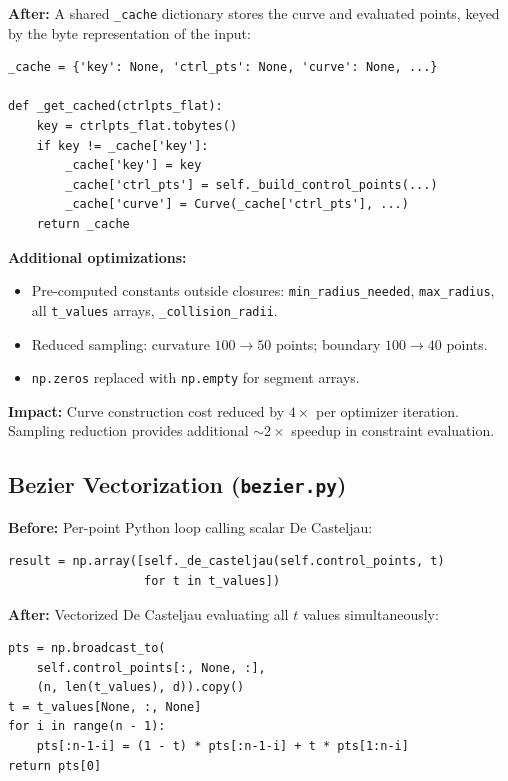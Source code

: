 \documentclass[11pt,a4paper]{article}
\begin{document}
\textbf{After:} A shared \texttt{\_cache} dictionary stores the curve and evaluated points, keyed by the byte representation of the input:
\begin{lstlisting}
_cache = {'key': None, 'ctrl_pts': None, 'curve': None, ...}

def _get_cached(ctrlpts_flat):
    key = ctrlpts_flat.tobytes()
    if key != _cache['key']:
        _cache['key'] = key
        _cache['ctrl_pts'] = self._build_control_points(...)
        _cache['curve'] = Curve(_cache['ctrl_pts'], ...)
    return _cache
\end{lstlisting}

\textbf{Additional optimizations:}
\begin{itemize}[nosep]
    \item Pre-computed constants outside closures: \texttt{min\_radius\_needed}, \texttt{max\_radius}, all \texttt{t\_values} arrays, \texttt{\_collision\_radii}.
    \item Reduced sampling: curvature $100 \to 50$ points; boundary $100 \to 40$ points.
    \item \texttt{np.zeros} replaced with \texttt{np.empty} for segment arrays.
\end{itemize}

\textbf{Impact:} Curve construction cost reduced by $4\times$ per optimizer iteration. Sampling reduction provides additional ${\sim}2\times$ speedup in constraint evaluation.

\subsection{Bezier Vectorization (\texttt{bezier.py})}

\textbf{Before:} Per-point Python loop calling scalar De Casteljau:
\begin{lstlisting}
result = np.array([self._de_casteljau(self.control_points, t)
                   for t in t_values])
\end{lstlisting}

\textbf{After:} Vectorized De Casteljau evaluating all $t$ values simultaneously:
\begin{lstlisting}
pts = np.broadcast_to(
    self.control_points[:, None, :],
    (n, len(t_values), d)).copy()
t = t_values[None, :, None]
for i in range(n - 1):
    pts[:n-1-i] = (1 - t) * pts[:n-1-i] + t * pts[1:n-i]
return pts[0]
\end{lstlisting}
\end{document}
